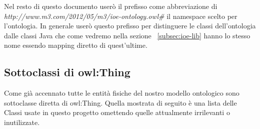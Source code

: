 Nel resto di questo documento userò il prefisso  come abbreviazione di \emph{http://www.m3.com/2012/05/m3/ioe-ontology.owl\#} il namespace scelto per l'ontologia. In generale userò questo prefisso per distinguere le classi dell'ontologia dalle classi Java che come vedremo nella sezione ~\ref{subsec:ioe-lib} hanno lo stesso nome essendo mapping diretto di quest'ultime.

\subsection{Sottoclassi di owl:Thing}\label{subsec:thing}

Come già accennato tutte le entità fisiche del nostro modello ontologico sono sottoclasse diretta di owl:Thing. Quella mostrata di seguito è una lista delle Classi usate in questo progetto omettendo quelle attualmente irrilevanti o inutilizzate.

